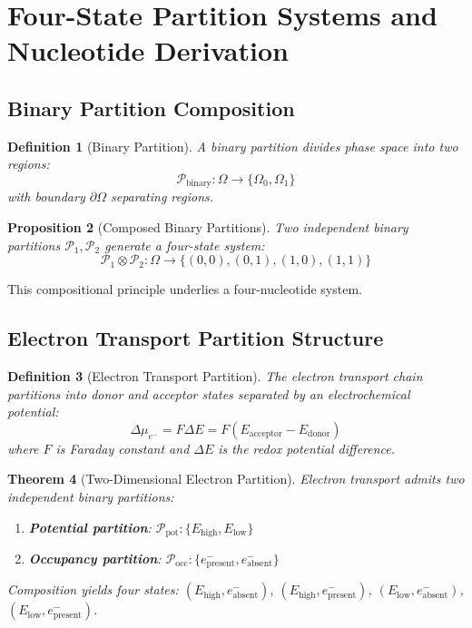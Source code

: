 \documentclass[11pt,a4paper]{article}
\newtheorem{theorem}{Theorem}[section]
\newtheorem{definition}[theorem]{Definition}
\newtheorem{proposition}[theorem]{Proposition}
\theoremstyle{remark}
\begin{document}
\section{Four-State Partition Systems and Nucleotide Derivation}

\subsection{Binary Partition Composition}

\begin{definition}[Binary Partition]
\label{def:binary_partition}
A binary partition divides phase space into two regions:
\begin{equation}
\mathcal{P}_{\text{binary}}: \Omega \to \{\Omega_0, \Omega_1\}
\end{equation}
with boundary $\partial\Omega$ separating regions.
\end{definition}

\begin{proposition}[Composed Binary Partitions]
\label{prop:composed_partitions}
Two independent binary partitions $\mathcal{P}_1, \mathcal{P}_2$ generate a four-state system:
\begin{equation}
\mathcal{P}_1 \otimes \mathcal{P}_2: \Omega \to \{(0,0), (0,1), (1,0), (1,1)\}
\end{equation}
\end{proposition}

This compositional principle underlies a four-nucleotide system.

\subsection{Electron Transport Partition Structure}

\begin{definition}[Electron Transport Partition]
\label{def:electron_partition}
The electron transport chain partitions into donor and acceptor states separated by an electrochemical potential:
\begin{equation}
\Delta\mu_{e^-} = F\Delta E = F(E_{\text{acceptor}} - E_{\text{donor}})
\end{equation}
where $F$ is Faraday constant and $\Delta E$ is the redox potential difference.
\end{definition}

\begin{theorem}[Two-Dimensional Electron Partition]
\label{thm:two_dim_electron}
Electron transport admits two independent binary partitions:
\begin{enumerate}
\item \textbf{Potential partition}: $\mathcal{P}_{\text{pot}}: \{E_{\text{high}}, E_{\text{low}}\}$
\item \textbf{Occupancy partition}: $\mathcal{P}_{\text{occ}}: \{e^-_{\text{present}}, e^-_{\text{absent}}\}$
\end{enumerate}
Composition yields four states: $(E_{\text{high}}, e^-_{\text{absent}})$, $(E_{\text{high}}, e^-_{\text{present}})$, $(E_{\text{low}}, e^-_{\text{absent}})$, $(E_{\text{low}}, e^-_{\text{present}})$.
\end{theorem}
\end{document}
